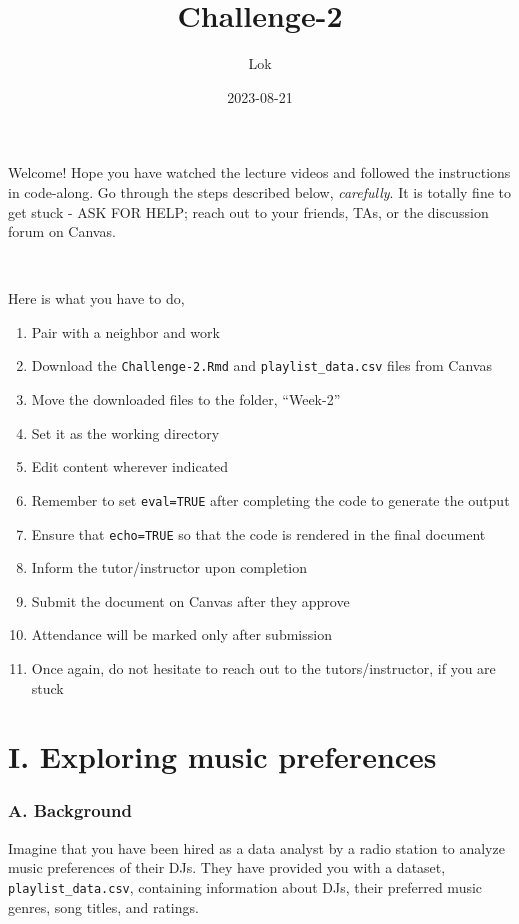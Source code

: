 \documentclass[
]{article}
\title{Challenge-2}
\author{Lok}
\date{2023-08-21}
\begin{document}
\maketitle

Welcome! Hope you have watched the lecture videos and followed the
instructions in code-along. Go through the steps described below,
\emph{carefully}. It is totally fine to get stuck - ASK FOR HELP; reach
out to your friends, TAs, or the discussion forum on Canvas.

~

Here is what you have to do,

\begin{enumerate}
\def\labelenumi{\arabic{enumi}.}
\item
  Pair with a neighbor and work
\item
  Download the \texttt{Challenge-2.Rmd} and \texttt{playlist\_data.csv}
  files from Canvas
\item
  Move the downloaded files to the folder, ``Week-2''
\item
  Set it as the working directory
\item
  Edit content wherever indicated
\item
  Remember to set \texttt{eval=TRUE} after completing the code to
  generate the output
\item
  Ensure that \texttt{echo=TRUE} so that the code is rendered in the
  final document
\item
  Inform the tutor/instructor upon completion
\item
  Submit the document on Canvas after they approve
\item
  Attendance will be marked only after submission
\item
  Once again, do not hesitate to reach out to the tutors/instructor, if
  you are stuck
\end{enumerate}

\hypertarget{i.-exploring-music-preferences}{%
\section{I. Exploring music
preferences}\label{i.-exploring-music-preferences}}

\hypertarget{a.-background}{%
\subsubsection{A. Background}\label{a.-background}}

Imagine that you have been hired as a data analyst by a radio station to
analyze music preferences of their DJs. They have provided you with a
dataset, \texttt{playlist\_data.csv}, containing information about DJs,
their preferred music genres, song titles, and ratings.
\end{document}
